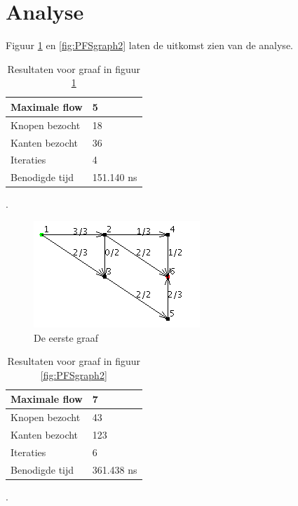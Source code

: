 \section{Analyse}

Figuur \ref{fig:PFSgraph1} en \ref{fig:PFSgraph2} laten de uitkomst zien van de analyse.

\begin{table}[h]
 \begin{tabularx}{\linewidth}{| l | X |}
 \hline
 Maximale flow & 5 \\
 \hline
 Knopen bezocht & 18 \\
 \hline
 Kanten bezocht & 36 \\
 \hline
 Iteraties & 4 \\
 \hline
 Benodigde tijd & 151.140 ns \\
 \hline
\end{tabularx}
\centering
\caption{Resultaten voor graaf in figuur \ref{fig:PFSgraph1}}.
\label{tbl:PFSgraph1}
\end{table}

\begin{figure}[h]
	\includegraphics[width=\linewidth]{priorityfirst/PFSgraph1}
	\centering
	\caption{De eerste graaf}
	\label{fig:PFSgraph1}
\end{figure}

\begin{table}[h]
 \begin{tabularx}{\linewidth}{| l | X |}
 \hline
 Maximale flow & 7 \\
 \hline
 Knopen bezocht & 43 \\
 \hline
 Kanten bezocht & 123 \\
 \hline
 Iteraties & 6 \\
 \hline
 Benodigde tijd & 361.438 ns \\
 \hline
\end{tabularx}
\centering
\caption{Resultaten voor graaf in figuur \ref{fig:PFSgraph2}}.
\label{tbl:PFSgraph2}
\end{table}

